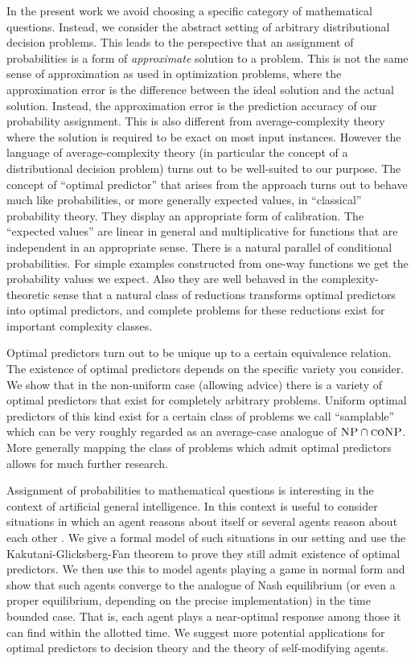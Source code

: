 \documentclass{article}
\numberwithin{equation}{section}
\theoremstyle{definition}
\theoremstyle{plain}
\begin{document}
In the present work we avoid choosing a specific category of mathematical questions. Instead, we consider the abstract setting of arbitrary distributional decision problems. This leads to the perspective that an assignment of probabilities is a form of \emph{approximate} solution to a problem. This is not the same sense of approximation as used in optimization problems, where the approximation error is the difference between the ideal solution and the actual solution. Instead, the approximation error is the prediction accuracy of our probability assignment. This is also different from average-complexity theory where the solution is required to be exact on most input instances. However the language of average-complexity theory (in particular the concept of a distributional decision problem) turns out to be well-suited to our purpose.
The concept of \enquote{optimal predictor} that arises from the approach turns out to behave much like probabilities, or more generally expected values, in \enquote{classical} probability theory. They display an appropriate form of calibration. The \enquote{expected values} are linear in general and multiplicative for functions that are independent in an appropriate sense. There is a natural parallel of conditional probabilities. For simple examples constructed from one-way functions we get the probability values we expect. Also they are well behaved in the complexity-theoretic sense that a natural class of reductions transforms optimal predictors into optimal predictors, and complete problems for these reductions exist for important complexity classes.

Optimal predictors turn out to be unique up to a certain equivalence relation. The existence of optimal predictors depends on the specific variety you consider. We show that in the non-uniform case (allowing advice) there is a variety of optimal predictors that exist for completely arbitrary problems. Uniform optimal predictors of this kind exist for a certain class of problems we call \enquote{samplable} which can be very roughly regarded as an average-case analogue of $\textsc{NP} \cap \textsc{coNP}$. More generally mapping the class of problems which admit optimal predictors allows for much further research.

Assignment of probabilities to mathematical questions is interesting in the context of artificial general intelligence\cite{Hutter_2013,Christiano_2014}. In this context is useful to consider situations in which an agent reasons about itself or several agents reason about each other \cite{Fallenstein_2015}. We give a formal model of such situations in our setting and use the Kakutani-Glicksberg-Fan theorem to prove they still admit existence of optimal predictors. We then use this to model agents playing a game in normal form and show that such agents converge to the analogue of Nash equilibrium (or even a proper equilibrium, depending on the precise implementation) in the time bounded case. That is, each agent plays a near-optimal response among those it can find within the allotted time. We suggest more potential applications for optimal predictors to decision theory and the theory of self-modifying agents.
\end{document}

